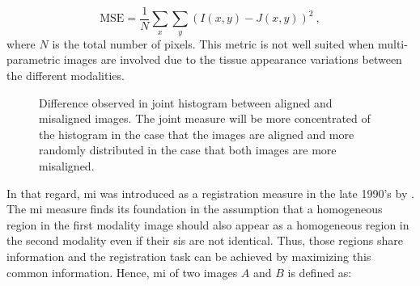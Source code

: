 \begin{equation}
	\text{MSE} =\frac{1}{N} \sum_x \sum_y ( I(x,y) - J(x,y) )^2 \ ,
	\label{eq:mse}
\end{equation}
\noindent where $N$ is the total number of pixels.
This metric is not well suited when multi-parametric images are involved due to the tissue appearance variations between the different modalities.

\begin{figure}
\centering
	\hspace*{\fill}
	 \hfill
	\hspace*{\fill}
	\caption[Difference observed in joint histogram between aligned and misaligned images.]{Difference observed in joint histogram between aligned and misaligned images. The joint measure will be more concentrated of the histogram in the case that the images are aligned and more randomly distributed in the case that both images are more misaligned.}
\end{figure}

In that regard, \ac{mi} was introduced as a registration measure in the late 1990's by \cite{Pluim2003}.
The \ac{mi} measure finds its foundation in the assumption that a homogeneous region in the first modality image should also appear as a homogeneous region in the second modality even if their \acp{si} are not identical.
Thus, those regions share information and the registration task can be achieved by maximizing this common information.
Hence, \Ac{mi} of two images $A$ and $B$ is defined as:

